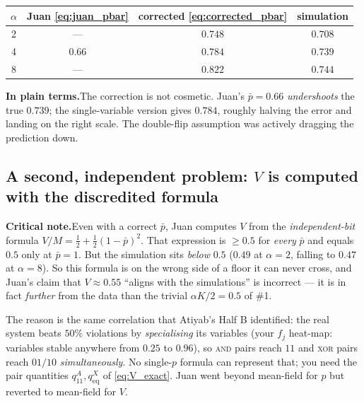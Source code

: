 \documentclass[11pt]{article}
\newcommand{\plain}[1]{%
  \par\smallskip\noindent
  \colorbox{yellow!18}{\parbox{\dimexpr\linewidth-2\fboxsep}{%
  \textbf{In plain terms.}\quad #1}}\par\smallskip}
\newcommand{\crit}[1]{%
  \par\smallskip\noindent
  \colorbox{red!8}{\parbox{\dimexpr\linewidth-2\fboxsep}{%
  \textbf{Critical note.}\quad #1}}\par\smallskip}
\begin{document}
\begin{center}
\begin{tabular}{cccc}
\toprule
$\alpha$ & Juan \eqref{eq:juan_pbar} & corrected \eqref{eq:corrected_pbar} & simulation\\
\midrule
2 & --- & $0.748$ & $0.708$\\
4 & $0.66$ & $0.784$ & $0.739$\\
8 & --- & $0.822$ & $0.744$\\
\bottomrule
\end{tabular}
\end{center}

\plain{The correction is not cosmetic. Juan's $\bar p=0.66$ \emph{undershoots} the true $0.739$;
the single-variable version gives $0.784$, roughly halving the error and landing on the right
scale. The double-flip assumption was actively dragging the prediction down.}

\subsection{A second, independent problem: $V$ is computed with the discredited formula}
\crit{Even with a correct $\bar p$, Juan computes $V$ from the \emph{independent-bit} formula
$V/M=\tfrac12+\tfrac12(1-\bar p)^2$. That expression is $\ge0.5$ for \emph{every} $\bar p$ and
equals $0.5$ only at $\bar p=1$. But the simulation sits \emph{below} $0.5$ ($0.49$ at
$\alpha=2$, falling to $0.47$ at $\alpha=8$). So this formula is on the wrong side of a floor it
can never cross, and Juan's claim that $V\approx0.55$ ``aligns with the simulations'' is
incorrect --- it is in fact \emph{further} from the data than the trivial $\alpha K/2=0.5$ of \#1.}

The reason is the same correlation that Atiyab's Half B identified: the real system beats $50\%$
violations by \emph{specialising} its variables (your $f_j$ heat-map: variables stable anywhere
from $0.25$ to $0.96$), so \textsc{and} pairs reach $11$ and \textsc{xor} pairs reach $01/10$
\emph{simultaneously}. No single-$p$ formula can represent that; you need the pair quantities
$q^A_{11},q^X_{\text{eq}}$ of \eqref{eq:V_exact}. Juan went beyond mean-field for $p$ but reverted
to mean-field for $V$.
\end{document}

